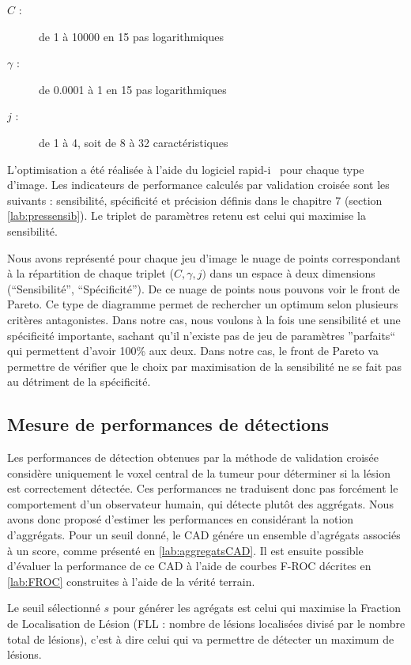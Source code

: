 \begin{description}
 \item [$C$ :] de 1 à 10000 en 15 pas logarithmiques
 \item [$\gamma$ :] de 0.0001 à 1 en 15 pas logarithmiques
 \item [$j$ :] de 1 à 4, soit de 8 à 32 caractéristiques
\end{description}

L'optimisation a été réalisée à l'aide du logiciel rapid-i~\cite{mierswa2006} pour chaque type d'image. Les indicateurs de performance calculés par validation croisée sont les suivants : sensibilité, spécificité et précision définis dans le chapitre 7 (section \ref{lab:pressensib}). Le triplet de paramètres retenu est celui qui maximise la sensibilité.

Nous avons représenté pour chaque jeu d'image le nuage de points correspondant à la répartition de chaque triplet ($C, \gamma, j)$ dans un espace à deux dimensions (``Sensibilité'', ``Spécificité''). De ce nuage de points nous pouvons voir le front de Pareto. Ce type de diagramme permet de rechercher un optimum selon plusieurs critères antagonistes. Dans notre cas, nous voulons à la fois une sensibilité et une spécificité importante, sachant qu'il n'existe pas de jeu de paramètres ''parfaits`` qui permettent d'avoir 100\% aux deux. Dans notre cas, le front de Pareto va permettre de vérifier que le choix par maximisation de la sensibilité ne se fait pas au détriment de la spécificité.


\subsection{Mesure de performances de détections}
\label{lab:selectionSeuil}
\label{lab:optimIMSTNOMS}
Les performances de détection obtenues par la méthode de validation croisée considère uniquement le voxel central de la tumeur
pour déterminer si la lésion est correctement détectée. Ces performances ne traduisent donc pas forcément le comportement d'un observateur humain, qui détecte plutôt des aggrégats. Nous avons donc proposé d'estimer les performances en considérant la notion d'aggrégats. Pour un seuil donné, le CAD génére un ensemble d'agrégats associés à un score, comme présenté en \ref{lab:aggregatsCAD}. Il est ensuite possible d'évaluer la performance de ce CAD à l'aide de courbes F-ROC décrites en \ref{lab:FROC} construites à l'aide de la vérité terrain.

Le seuil sélectionné $s$ pour générer les agrégats est celui qui maximise la Fraction de Localisation de Lésion (FLL : nombre de lésions localisées divisé par le nombre total de lésions), c'est à dire celui qui va permettre de détecter un maximum de lésions. 

